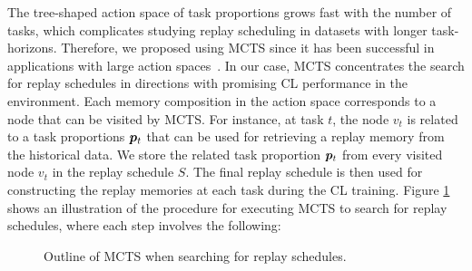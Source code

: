 The tree-shaped action space of task proportions grows fast with the number of tasks, which complicates studying replay scheduling in datasets with longer task-horizons. 
Therefore, we proposed using MCTS since it has been successful in applications with large action spaces~\cite{browne2012survey, chaudhry2018feature, silver2016mastering}. In our case, MCTS concentrates the search for replay schedules in directions with promising CL performance in the environment. 
Each memory composition in the action space corresponds to a node that can be visited by MCTS. For instance, at task $t$, the node $v_t$ is related to a task proportions ${\bm{p}}_{t}$ that can be used for retrieving a replay memory from the historical data. 
We store the related task proportion ${\bm{p}}_t$ from every visited node $v_t$ in the replay schedule $S$. The final replay schedule is then used for constructing the replay memories at each task during the CL training. 
Figure \ref{fig:mcts_outline} shows an illustration of the procedure for executing MCTS to search for replay schedules, where each step involves the following:

\begin{figure}[t]
	\centering
	
	\caption{Outline of MCTS when searching for replay schedules. }
	\label{fig:mcts_outline}
	\vspace{-3mm}
\end{figure}

